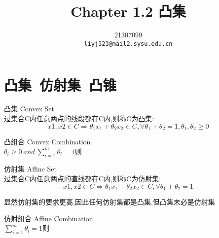 \documentclass{mytemplate}
\title{Chapter 1.2 凸集}
\author{%
    21307099\\
    \texttt{liyj323@mail2.sysu.edu.cn} \\
}
\begin{document}
\maketitle

\tableofcontents

\section{凸集\ 仿射集\ 凸锥}
\begin{definition}{凸集 Convex Set}\\
    过集合C内任意两点的线段都在C内,则称C为凸集:
    \[x1,x2 \in C \Rightarrow \theta_1 x_1 + \theta_2 x_2 \in C
        , \forall \theta_1 + \theta_2 = 1,\theta_1,\theta_2 \geq 0
    \]
\end{definition}

\begin{definition}{凸组合 Convex Combination}\\
    $\theta_i \geq 0 \ and\  \sum_{i=1}^{m} \theta_i = 1$则
\end{definition}

\begin{definition}{仿射集 Affine Set}\\
    过集合C内任意两点的直线都在C内,则称C为仿射集:
    \[x1,x2 \in C \Rightarrow \theta_1 x_1 + \theta_2 x_2 \in C
        , \forall \theta_1 + \theta_2 = 1
    \]
\end{definition}
显然仿射集的要求更高,因此任何仿射集都是凸集,但凸集未必是仿射集
\begin{definition}{仿射组合 Affine Combination}\\
    $\sum_{i=1}^{m} \theta_i = 1$则
\end{definition}

\end{document}
